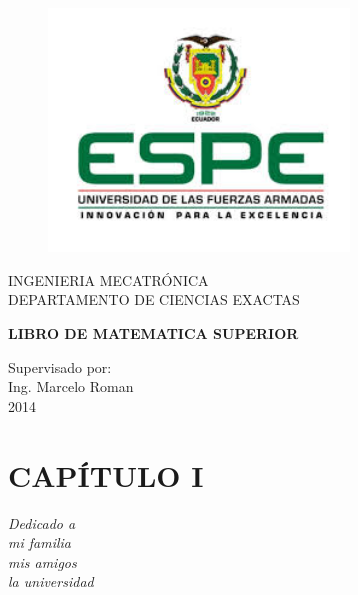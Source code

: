 \documentclass[11pt,a4paper,openright]{book}
\begin{document}

\begin{titlepage}
 \begin{center}
  \vspace*{-1in}
  \begin{figure}[htb]
   \begin{center}
    \includegraphics[width=8cm]{espe.jpg}
   \end{center}
 \end{figure}

  INGENIERIA MECATRÓNICA\\
  \vspace*{0.15in}
  DEPARTAMENTO DE CIENCIAS EXACTAS\\
  \vspace*{0.6in}
  \begin{Large}
   \textbf{LIBRO DE MATEMATICA SUPERIOR} \\
	\author{Maqueavelo Hidrovo}
	\author{Jose Jacome}   
	\author{Erik Quijije}
  \end{Large}
  \vspace*{0.3in}
  \begin{large}
   Supervisado por: \\
   Ing. Marcelo Roman \\
   2014\\
  \end{large}
 \end{center}
\end{titlepage}

\chapter*{CAPÍTULO I}
\begin{flushright}
\textit{Dedicado a \\
mi familia \\
mis amigos \\
la universidad}
\end{flushright}
\end{document}
